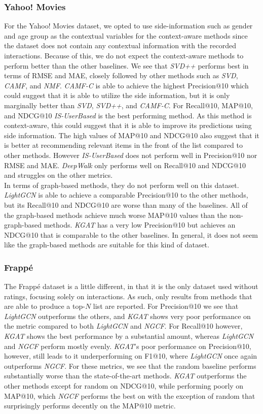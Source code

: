 \subsubsection{Yahoo! Movies}
For the Yahoo! Movies dataset, we opted to use side-information such as gender and age group as the contextual variables for the context-aware methods since the dataset does not contain any contextual information with the recorded interactions.
Because of this, we do not expect the context-aware methods to perform better than the other baselines.
We see that \textit{SVD++} performs best in terms of RMSE and MAE, closely followed by other methods such as \textit{SVD}, \textit{CAMF}, and \textit{NMF}.
\textit{CAMF-C} is able to achieve the highest Precision@10 which could suggest that it is able to utilize the side information, but it is only marginally better than \textit{SVD}, \textit{SVD++}, and \textit{CAMF-C}.
For Recall@10, MAP@10, and NDCG@10 \textit{IS-UserBased} is the best performing method.
As this method is context-aware, this could suggest that it is able to improve its predictions using side information.
The high values of MAP@10 and NDCG@10 also suggest that it is better at recommending relevant items in the front of the list compared to other methods.
However \textit{IS-UserBased} does not perform well in Precision@10 nor RMSE and MAE.
\textit{DeepWalk} only performs well on Recall@10 and NDCG@10 and struggles on the other metrics.
\\
In terms of graph-based methods, they do not perform well on this dataset.
\textit{LightGCN} is able to achieve a comparable Precision@10 to the other methods, but its Recall@10 and NDCG@10 are worse than many of the baselines.
All of the graph-based methods achieve much worse MAP@10 values than the non-graph-based methods.
\textit{KGAT} has a very low Precision@10 but achieves an NDCG@10 that is comparable to the other baselines.
In general, it does not seem like the graph-based methods are suitable for this kind of dataset.

\subsubsection{Frappé}
The Frappé dataset is a little different, in that it is the only dataset used without ratings, focusing solely on interactions.
As such, only results from methods that are able to produce a top-$N$ list are reported.
For Precision@10 we see that \textit{LightGCN} outperforms the others, and \textit{KGAT} shows very poor performance on the metric compared to both \textit{LightGCN} and \textit{NGCF}.
For Recall@10 however, \textit{KGAT} shows the best performance by a substantial amount, whereas \textit{LightGCN} and \textit{NGCF} perform mostly evenly.
\textit{KGAT}'s poor performance on Precision@10, however, still leads to it underperforming on F1@10, where \textit{LightGCN} once again outperforms \textit{NGCF}.
For these metrics, we see that the random baseline performs substantially worse than the state-of-the-art methods.
\textit{KGAT} outperforms the other methods except for random on NDCG@10, while performing poorly on MAP@10, which \textit{NGCF} performs the best on with the exception of random that surprisingly performs decently on the MAP@10 metric.
